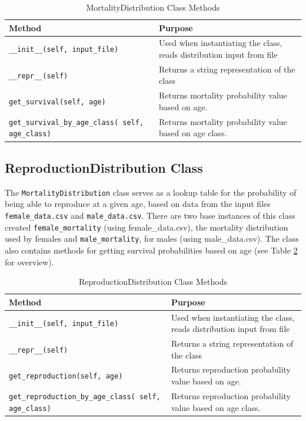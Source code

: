 \documentclass[authoryearcitations]{UoYCSproject}
\begin{document}
\begin{table}[h]
\caption{MortalityDistribution Class Methods}
\label{tbl:mortalityDistributionMethods}
\begin{tabular}{m{} m{}}
\textbf{Method} & \textbf{Purpose} \\\hline
\texttt{\_\_init\_\_(self, input\_file)} & Used when instantiating the class, reads distribution input from file\\\hline
\texttt{\_\_repr\_\_(self)} & Returns a string representation of the class \\\hline
\texttt{get\_survival(self, age)} & Returns mortality probability value based on age.\\\hline
\texttt{get\_survival\_by\_age\_class( self, age\_class)} &  Returns mortality probability value based on age class.
\end{tabular}
\end{table}

\newpage
\subsection{ReproductionDistribution Class}
The \texttt{MortalityDistribution} class serves as a lookup table for the probability of being able to reproduce at a given age, based on data from the input files \texttt{female\_data.csv} and \texttt{male\_data.csv}. There are two base instances of this class created \texttt{female\_mortality} (using female\_data.csv), the mortality distribution used by females and \texttt{male\_mortality}, for males (using male\_data.csv). The class also contains methods for getting survival probabilities based on age (see Table \ref{tbl:reproductionDistributionMethods} for overview).


\begin{table}[h]
\caption{ReproductionDistribution Class Methods}
\label{tbl:reproductionDistributionMethods}
\begin{tabular}{m{} m{}}
\textbf{Method} & \textbf{Purpose} \\\hline
\texttt{\_\_init\_\_(self, input\_file)} & Used when instantiating the class, reads distribution input from file\\\hline
\texttt{\_\_repr\_\_(self)} & Returns a string representation of the class \\\hline
\texttt{get\_reproduction(self, age)} & Returns reproduction probability value based on age.\\\hline
\small\texttt{get\_reproduction\_by\_age\_class( self, age\_class)} \normalsize &  Returns reproduction probability value based on age class.
\end{tabular}
\end{table}
\end{document}
